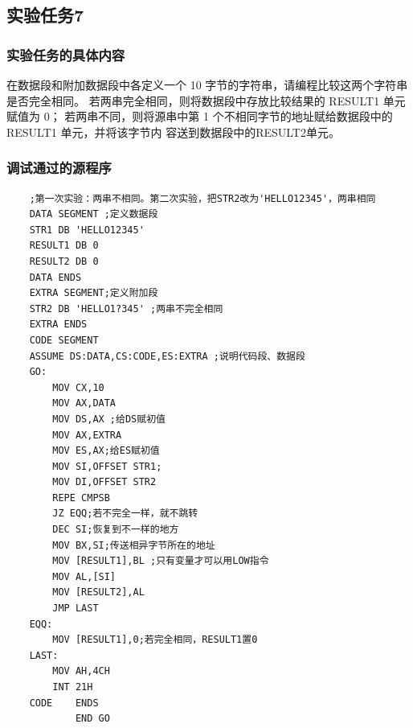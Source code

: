 \documentclass[12pt, a4paper, oneside]{ctexart}
\begin{document}
\subsection{实验任务7}
\subsubsection{实验任务的具体内容}
在数据段和附加数据段中各定义一个 10 字节的字符串，请编程比较这两个字符串是否完全相同。
 若两串完全相同，则将数据段中存放比较结果的 RESULT1 单元赋值为 0； 
 若两串不同，则将源串中第 1 个不相同字节的地址赋给数据段中的 RESULT1 单元，并将该字节内
容送到数据段中的RESULT2单元。
\subsubsection{调试通过的源程序}
\begin{lstlisting}
    ;第一次实验：两串不相同。第二次实验，把STR2改为'HELLO12345'，两串相同
    DATA SEGMENT ;定义数据段
    STR1 DB 'HELLO12345'
    RESULT1 DB 0
    RESULT2 DB 0
    DATA ENDS
    EXTRA SEGMENT;定义附加段
    STR2 DB 'HELLO1?345' ;两串不完全相同
    EXTRA ENDS
    CODE SEGMENT 
    ASSUME DS:DATA,CS:CODE,ES:EXTRA ;说明代码段、数据段
    GO: 
        MOV CX,10
        MOV AX,DATA 
        MOV DS,AX ;给DS赋初值
        MOV AX,EXTRA
        MOV ES,AX;给ES赋初值
        MOV SI,OFFSET STR1;
        MOV DI,OFFSET STR2
        REPE CMPSB
        JZ EQQ;若不完全一样，就不跳转
        DEC SI;恢复到不一样的地方
        MOV BX,SI;传送相异字节所在的地址
        MOV [RESULT1],BL ;只有变量才可以用LOW指令
        MOV AL,[SI]
        MOV [RESULT2],AL
        JMP LAST
    EQQ: 
        MOV [RESULT1],0;若完全相同，RESULT1置0
    LAST:
        MOV AH,4CH
        INT 21H
    CODE 	ENDS
            END GO
\end{lstlisting}
\end{document}
